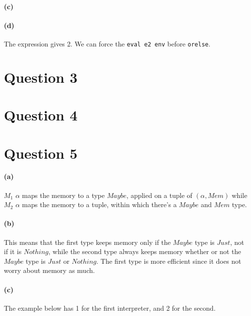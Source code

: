 \documentclass[11pt]{article} %
\begin{document}


\paragraph{(c)}



\paragraph{(d)}
The expression gives 2. We can force the \texttt{eval e2 env} before \texttt{orelse}.



\section*{Question 3}


\section*{Question 4}


\section*{Question 5}
\paragraph{(a)}
$M_1$ $\alpha$ maps the memory to a type $Maybe$, applied on a tuple of $(\alpha,Mem)$
while $M_2$ $\alpha$ maps the memory to a tuple, within which there's a $Maybe$ and $Mem$ type.

\paragraph{(b)}
This means that the first type keeps memory only if the $Maybe$ type is $Just$, not if it is $Nothing$,
while the second type always keeps memory whether or not the $Maybe$ type is $Just$ or $Nothing$.
The first type is more efficient since it does not worry about memory as much.

\paragraph{(c)}
The example below has 1 for the first interpreter, and 2 for the second.

\end{document}
